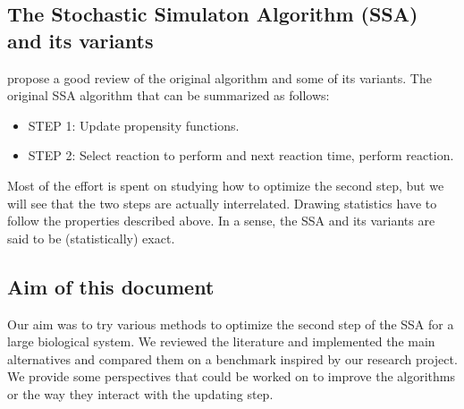 \documentclass[12pt]{scrartcl}
\theoremstyle{definition}
\theoremstyle{remark}
\numberwithin{equation}{section}
\begin{document}
\subsection{The Stochastic Simulaton Algorithm (SSA) and its variants}

\citet{gillespie_perspective:_2013} propose a good review of the original algorithm and some of its variants. The original SSA algorithm that can be summarized as follows:

\begin{itemize}
\item STEP 1: Update propensity functions.
\item STEP 2: Select reaction to perform and next reaction time, perform reaction.
\end{itemize}

Most of the effort is spent on studying how to optimize the second step, but we will see that the two steps are actually interrelated. Drawing statistics have to follow the properties described above. In a sense, the SSA and its variants are said to be (statistically) exact.

\subsection{Aim of this document}

Our aim was to try various methods to optimize the second step of the SSA for a large biological system. We reviewed the literature and implemented the main alternatives and compared them on a benchmark inspired by our research project. We provide some perspectives that could be worked on to improve the algorithms or the way they interact with the updating step.






\appendix




\end{document}

